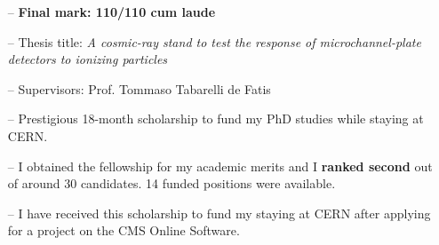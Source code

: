 \documentclass[10pt,a4paper]{altacv}
\begin{document}
\begin{itemize}
    \setlength{\itemindent}{0.5em}
    \item[--]   \textbf{Final mark: 110/110 cum laude}
    \item[--]   Thesis title: \textit{A cosmic-ray stand to test the response of microchannel-plate detectors to ionizing particles}
    \item[--]   Supervisors: Prof. Tommaso Tabarelli de Fatis
\end{itemize}



\begin{itemize}
    \setlength{\itemindent}{0.5em}
    \item[--]   Prestigious 18-month scholarship to fund my PhD studies while staying at CERN. 
\end{itemize}

\medskip


\begin{itemize}
    \setlength{\itemindent}{0.5em}
    \item[--]   I obtained the fellowship for my academic merits and I \textbf{ranked second} out of around 30 candidates. 14 funded positions were available.
\end{itemize}

\medskip


\begin{itemize}
    \setlength{\itemindent}{0.5em}
    \item[--]   I have received this scholarship to fund my staying at CERN after applying for a project on the CMS Online Software.
\end{itemize}

\newpage


\end{document}
